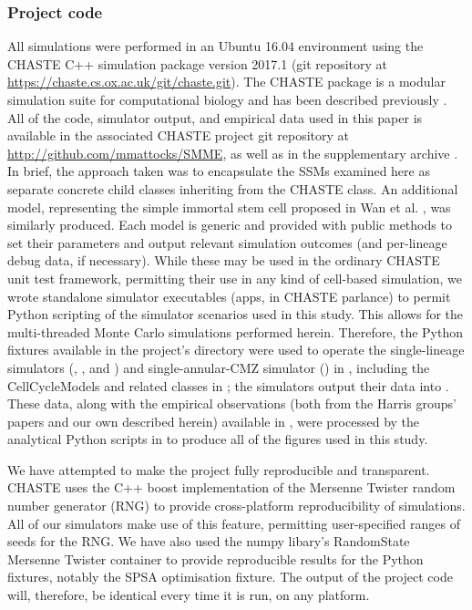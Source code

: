 \subsubsection{Project code}
All simulations were performed in an Ubuntu 16.04 environment using the CHASTE C++ simulation package version 2017.1 (git repository at \url{https://chaste.cs.ox.ac.uk/git/chaste.git}). The CHASTE package is a modular simulation suite for computational biology and has been described previously \cite{Mirams2013}. All of the code, simulator output, and empirical data used in this paper is available in the associated CHASTE project git repository at \url{http://github.com/mmattocks/SMME}, as well as in the supplementary archive . In brief, the approach taken was to encapsulate the SSMs examined here as separate concrete child classes inheriting from the CHASTE  class. An additional model, representing the simple immortal stem cell proposed in Wan et al. \cite{Wan2016}, was similarly produced. Each model is generic and provided with public methods to set their parameters and output relevant simulation outcomes (and per-lineage debug data, if necessary). While these may be used in the ordinary CHASTE unit test framework, permitting their use in any kind of cell-based simulation, we wrote standalone simulator executables (apps, in CHASTE parlance) to permit Python scripting of the simulator scenarios used in this study. This allows for the multi-threaded Monte Carlo simulations performed herein. Therefore, the Python fixtures available in the project's  directory were used to operate the single-lineage simulators (, , and ) and single-annular-CMZ simulator () in , including the CellCycleModels and related classes in ; the simulators output their data into . These data, along with the empirical observations (both from the Harris groups' papers and our own described herein) available in , were processed by the analytical Python scripts in  to produce all of the figures used in this study.

We have attempted to make the project fully reproducible and transparent. CHASTE uses the C++ boost implementation of the Mersenne Twister random number generator (RNG) to provide cross-platform reproducibility of simulations. All of our simulators make use of this feature, permitting user-specified ranges of seeds for the RNG. We have also used the numpy libary's RandomState Mersenne Twister container to provide reproducible results for the Python fixtures, notably the SPSA optimisation fixture. The output of the project code will, therefore, be identical every time it is run, on any platform.

